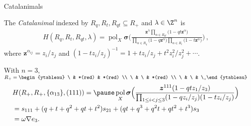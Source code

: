 \documentclass[dvipsnames]{beamer}
\newcommand{\mynone}{\ }
\newcommand{\zz}{{\boldsymbol z}}
\newcommand{\sigmabold}{\boldsymbol \sigma}
\DeclareMathOperator{\pol}{pol}
\theoremstyle{definition}
\newcounter{c}
\begin{document}
\begin{frame}{Catalanimals}
  \begin{definition}
    The \emph{Catalanimal} indexed by $R_q, R_t, R_{qt} \subseteq R_+$
    and $\lambda \in \Z^n$ is \pause\vspace{-.4mm}
    \begin{align*}
      H(R_q,R_t,R_{qt},\lambda)
      = \pol_X \sigmabold
      \bigg(\frac{\zz ^\lambda \prod_{\alpha \in
      R_{qt}} \big(1-q  t \zz ^\alpha \big)} {\prod_{\alpha \in R_q} \big(1-q \zz ^\alpha\big)
      \prod_{\alpha \in R_t} \big(1-t \zz ^\alpha\big)} 
      \bigg)\,,
    \end{align*}
   where \(\zz^{\alpha_{ij}} = z_i/z_j\) and \((1-t z_i/z_j)^{-1} =
   1+tz_i/z_j+t^2 z_i^2/z_j^2+\cdots\).
  \end{definition}
  \pause
With  $n=3$, \(R_+ =
\begin{ytableau}
  \mynone & *(red) & *(red) \\
  \mynone & \mynone & *(red) \\
  \mynone & \mynone & \mynone
\end{ytableau}
\)
\vspace{-3mm}
\begin{eqnarray*}
& \displaystyle H(R_+,R_+,\{\alpha_{13}\}, (111)) = \pause 
\pol_X \sigmabold \Big( \frac{\zz^{111} (1 - q t z_{1} /z_3)}
{\prod_{1\le i < j \le 3}(1 - q z_{i}/ z_{j})(1 - t z_{i}/ z_{j})} \Big)  \\
&  = s_{111} + (q+t+q^2+qt+t^2)s_{21}+ (qt + q^3+ q^2t + qt^2+t^3)s_{3} \\
& = \omega \nabla e_3.
\end{eqnarray*}
\vspace{4mm}
\end{frame}
\end{document}
